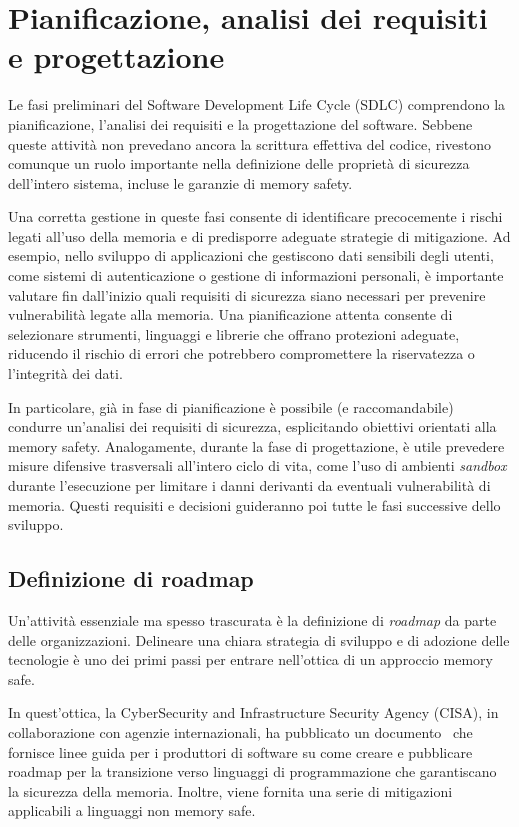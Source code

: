 \section{Pianificazione, analisi dei requisiti e progettazione}
\label{sec:planning_requirements_design}

Le fasi preliminari del Software Development Life Cycle (SDLC) comprendono la pianificazione,
l'analisi dei requisiti e la progettazione del software. Sebbene queste attività
non prevedano ancora la scrittura effettiva del codice, rivestono comunque un
ruolo importante nella definizione delle proprietà di sicurezza dell'intero
sistema, incluse le garanzie di memory safety.

Una corretta gestione in queste fasi consente di identificare precocemente i rischi
legati all'uso della memoria e di predisporre adeguate strategie di mitigazione.
Ad esempio, nello sviluppo di applicazioni che gestiscono dati sensibili degli utenti,
come sistemi di autenticazione o gestione di informazioni personali, è importante
valutare fin dall'inizio quali requisiti di sicurezza siano necessari per prevenire
vulnerabilità legate alla memoria. Una pianificazione attenta consente di
selezionare strumenti, linguaggi e librerie che offrano protezioni adeguate,
riducendo il rischio di errori che potrebbero compromettere la riservatezza o l'integrità
dei dati.

In particolare, già in fase di pianificazione è possibile (e raccomandabile) condurre
un'analisi dei requisiti di sicurezza, esplicitando obiettivi orientati alla
memory safety. Analogamente, durante la fase di progettazione, è utile prevedere
misure difensive trasversali all'intero ciclo di vita, come l'uso di ambienti
\textit{sandbox} durante l'esecuzione per limitare i danni derivanti da eventuali vulnerabilità
di memoria. Questi requisiti e decisioni guideranno poi tutte le fasi successive
dello sviluppo.

\subsection{Definizione di roadmap}
\label{sec:roadmap} Un'attività essenziale ma spesso trascurata è la definizione
di \textit{roadmap} da parte delle organizzazioni. Delineare una chiara
strategia di sviluppo e di adozione delle tecnologie è uno dei primi passi per
entrare nell'ottica di un approccio memory safe.

In quest'ottica, la CyberSecurity and Infrastructure Security Agency (CISA), in
collaborazione con agenzie internazionali, ha pubblicato un documento~\cite{memory_safe_roadmaps}
che fornisce linee guida per i produttori di software su come creare e pubblicare
roadmap per la transizione verso linguaggi di programmazione che garantiscano la
sicurezza della memoria. Inoltre, viene fornita una serie di mitigazioni applicabili
a linguaggi non memory safe.

